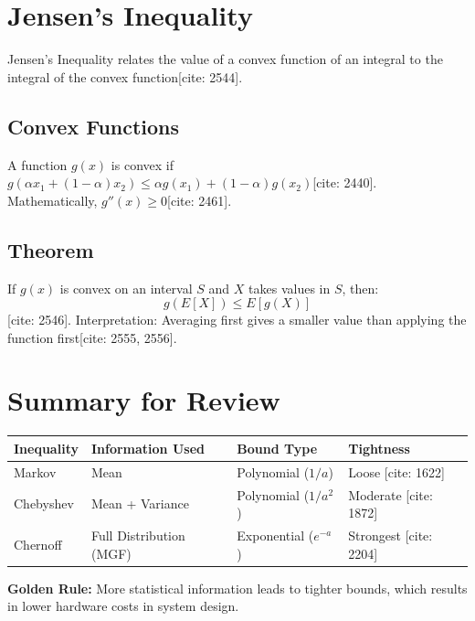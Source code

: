 \documentclass[11pt]{article}
\begin{document}
\section{Jensen's Inequality}
Jensen's Inequality relates the value of a convex function of an integral to the integral of the convex function[cite: 2544].

\subsection{Convex Functions}
A function $g(x)$ is convex if $g(\alpha x_1 + (1-\alpha)x_2) \le \alpha g(x_1) + (1-\alpha)g(x_2)$[cite: 2440]. Mathematically, $g''(x) \ge 0$[cite: 2461].

\subsection{Theorem}
If $g(x)$ is convex on an interval $S$ and $X$ takes values in $S$, then:
\begin{equation}
g(E[X]) \le E[g(X)]
\end{equation}
[cite: 2546]. Interpretation: Averaging first gives a smaller value than applying the function first[cite: 2555, 2556].

\section{Summary for Review}
\begin{table}[h]
\centering
\begin{tabular}{|l|l|l|l|}
\hline
\textbf{Inequality} & \textbf{Information Used} & \textbf{Bound Type} & \textbf{Tightness} \\ \hline
Markov              & Mean                      & Polynomial ($1/a$)  & Loose [cite: 1622] \\ \hline
Chebyshev           & Mean + Variance           & Polynomial ($1/a^2$)& Moderate [cite: 1872] \\ \hline
Chernoff            & Full Distribution (MGF)   & Exponential ($e^{-a}$)& Strongest [cite: 2204] \\ \hline
\end{tabular}
\end{table}
\textbf{Golden Rule:} More statistical information leads to tighter bounds, which results in lower hardware costs in system design.
\end{document}
